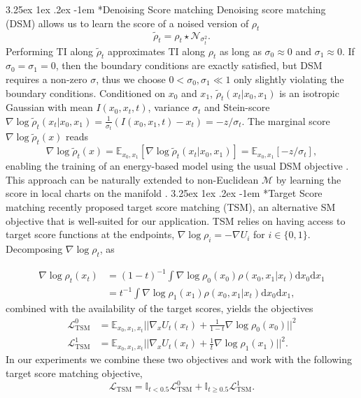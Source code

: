 \documentclass[%
onecolumn,
superscriptaddress,
nofootinbib,
amsmath,amssymb,
table
]{revtex4-2}
\makeatletter
\renewcommand\paragraph{%
  \@startsection{paragraph}{4}{\z@}%
    {3.25ex \@plus1ex \@minus.2ex}%
    {-1em}%
    {\normalfont\normalsize\bfseries}%
}
\makeatother
\begin{document}
\paragraph*{Denoising Score matching}
Denoising score matching (DSM) allows us to learn the score of a noised version of $\rho_t$
\begin{equation}
    \tilde \rho_t = \rho_t \star \mathcal N_{\sigma_t^2}.
\end{equation}
Performing TI along $\tilde \rho_t$  approximates TI along $ \rho_t$ as long as $\sigma_0\approx 0$ and $\sigma_1 \approx 0$. If $\sigma_0=\sigma_1=0$, then the boundary conditions are exactly satisfied, but DSM requires a non-zero $\sigma$, thus we choose $0<\sigma_0,\sigma_1 \ll 1$ only slightly violating the boundary conditions.
Conditioned on $x_0$ and $x_1$, $\tilde \rho_t(x_t|x_0,x_1)$ is an isotropic Gaussian with mean $I(x_0,x_t,t)$, variance $\sigma_t$ and Stein-score $\nabla \log \tilde \rho_t(x_t|x_0,x_1)=\frac{1}{\sigma_t}(I(x_0,x_1,t)-x_t)=-z/\sigma_t$. The marginal score $\nabla \log \tilde \rho_t(x)$ reads
\begin{equation}
    \nabla \log \tilde \rho_t(x) = \mathbb{E}_{x_0,x_1}\left[\nabla \log \tilde \rho_t(x_t|x_0,x_1)\right] = \mathbb{E}_{x_0,x_1}\left[-z/\sigma_t\right],
\end{equation}
enabling the training of an energy-based model using the usual DSM objective \citep{vincent2011connection}. This approach can be naturally extended to non-Euclidean $\mathcal M$ by learning the score in local charts on the manifold \citep{de2022riemannian}. 
\paragraph*{Target Score matching}
\citet{de2024target} recently proposed target score matching (TSM), an alternative SM objective that is well-suited for our application. TSM relies on having access to target score functions at the endpoints, $\nabla \log \rho_i = -\nabla U_i $ for $i \in \{0,1\}$. Decomposing  $\nabla \log \rho_t$, as

\begin{align}
    \nabla \log \rho_t(x_t)&=(1-t)^{-1}\int \nabla \log \rho_0(x_0) \rho(x_0,x_1|x_t) \mathrm dx_0 \mathrm dx_1 \\
    &= t^{-1}\int \nabla \log \rho_1(x_1) \rho(x_0,x_1|x_t) \mathrm dx_0 \mathrm dx_1, 
\end{align}
combined with the availability of the target scores, yields the objectives
\begin{align}
    \label{eq:TSM}
    \mathcal L^0_{\mathrm {TSM}} &= \mathbb E_{x_0,x_1,x_t} ||\nabla_x U_t(x_t)+\tfrac{1}{1-t}\nabla \log \rho_0(x_0)||^2 \\
    \mathcal L^1_{\mathrm {TSM}} &= \mathbb E_{x_0,x_1,x_t} ||\nabla_x U_t(x_t)+\tfrac{1}{t}\nabla \log \rho_1(x_1)||^2.
\end{align}
In our experiments we combine these two objectives and work with the following target score matching objective,
\begin{equation}
    \mathcal L_{\mathrm {TSM}} = \mathbb I_{t<0.5}\mathcal L^0_{\mathrm {TSM}} +  \mathbb I_{t\geq 0.5}\mathcal L^1_{\mathrm {TSM}}.
\end{equation}
\end{document}
